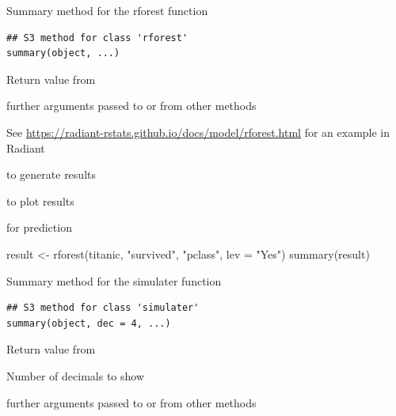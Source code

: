 \documentclass[a4paper]{book}
\begin{document}
%
\begin{Description}
Summary method for the rforest function
\end{Description}
%
\begin{Usage}
\begin{verbatim}
## S3 method for class 'rforest'
summary(object, ...)
\end{verbatim}
\end{Usage}
%
\begin{Arguments}
\begin{ldescription}
\item[\code{object}] Return value from 

\item[\code{...}] further arguments passed to or from other methods
\end{ldescription}
\end{Arguments}
%
\begin{Details}
See \url{https://radiant-rstats.github.io/docs/model/rforest.html} for an example in Radiant
\end{Details}
%
\begin{SeeAlso}
 to generate results

 to plot results

 for prediction
\end{SeeAlso}
%
\begin{Examples}
\begin{ExampleCode}
result <- rforest(titanic, "survived", "pclass", lev = "Yes")
summary(result)

\end{ExampleCode}
\end{Examples}
%
\begin{Description}
Summary method for the simulater function
\end{Description}
%
\begin{Usage}
\begin{verbatim}
## S3 method for class 'simulater'
summary(object, dec = 4, ...)
\end{verbatim}
\end{Usage}
%
\begin{Arguments}
\begin{ldescription}
\item[\code{object}] Return value from 

\item[\code{dec}] Number of decimals to show

\item[\code{...}] further arguments passed to or from other methods
\end{ldescription}
\end{Arguments}
\end{document}
